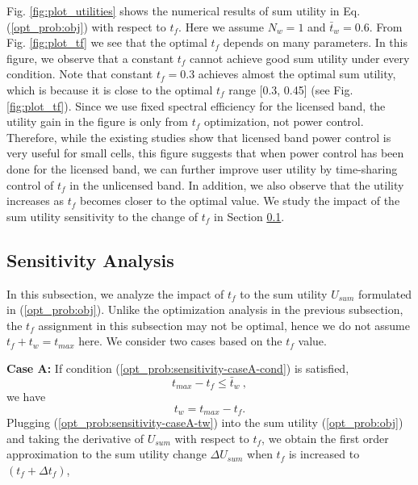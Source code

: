 \documentclass[journal,final,letterpaper,10pt,doublecolumn,twoside]{IEEEtran}
\begin{document}
Fig. \ref{fig:plot_utilities} shows the numerical results of sum utility in Eq. (\ref{opt_prob:obj}) with respect to $t_f$. Here we assume $N_w=1$ and $\bar{t}_w = 0.6$.
From Fig. \ref{fig:plot_tf} we see that the optimal $t_f$ depends on many parameters. In this figure, we observe that a constant $t_f$ cannot achieve good sum utility under every condition.
Note that constant $t_f=0.3$ achieves almost the optimal sum utility, which is because it is close to the optimal $t_f$ range [0.3, 0.45] (see Fig. \ref{fig:plot_tf}). Since we use fixed spectral efficiency for the licensed band, the utility gain in the figure is only from $t_f$ optimization, not power control.
Therefore, while the existing studies \cite{femto-PowerControl-2010Sundeep}  show that licensed band power control is very useful for small cells, this figure suggests that when power control has been done for the licensed band, we can further improve user utility by time-sharing control of $t_f$ in the unlicensed band.
In addition, we also observe that the utility increases as $t_f$ becomes closer to the optimal value. We study the impact of the sum utility sensitivity to the change of $t_f$ in Section \ref{subsec:Sensitivity-Analysis}.


\subsection{Sensitivity Analysis} \label{subsec:Sensitivity-Analysis}
In this subsection, we analyze the impact of $t_f$  to the sum utility $U_{sum}$  formulated in (\ref{opt_prob:obj}). Unlike the optimization analysis in the previous subsection, the $t_f$ assignment in this subsection may not be optimal, hence we do not assume $t_f + t_w = t_{max}$ here. We consider two cases based on the $t_f$ value.


\textbf{Case A:} If condition (\ref{opt_prob:sensitivity-caseA-cond}) is satisfied,
\begin{equation}
t_{max} - t_f \leq  \bar{t}_w~ , \label{opt_prob:sensitivity-caseA-cond}
\end{equation}
we have
\begin{equation}
t_w = t_{max} - t_f.
 \label{opt_prob:sensitivity-caseA-tw}
\end{equation}
Plugging (\ref{opt_prob:sensitivity-caseA-tw}) into the sum utility (\ref{opt_prob:obj})  and taking the derivative of $U_{sum}$ with respect to $t_f$, we obtain the first order approximation to the sum utility change $\Delta U_{sum}$ when $t_f$ is increased to $(t_f+\Delta t_f)$,
\end{document}
